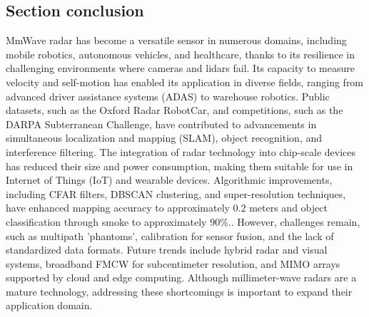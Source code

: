 \subsection{Section conclusion}
MmWave radar has become a versatile sensor in numerous domains, including mobile robotics, autonomous vehicles, and healthcare, thanks to its resilience in challenging environments where cameras and lidars fail. Its capacity to measure velocity and self-motion has enabled its application in diverse fields, ranging from advanced driver assistance systems (ADAS) to warehouse robotics.
Public datasets, such as the Oxford Radar RobotCar, and competitions, such as the DARPA Subterranean Challenge, have contributed to advancements in simultaneous localization and mapping (SLAM), object recognition, and interference filtering. The integration of radar technology into chip-scale devices has reduced their size and power consumption, making them suitable for use in Internet of Things (IoT) and wearable devices. 
Algorithmic improvements, including CFAR filters, DBSCAN clustering, and super-resolution techniques, have enhanced mapping accuracy to approximately 0.2 meters and object classification through smoke to approximately 90\%.. 
However, challenges remain, such as multipath 'phantoms', calibration for sensor fusion, and the lack of standardized data formats. Future trends include hybrid radar and visual systems, broadband FMCW for subcentimeter resolution, and MIMO arrays supported by cloud and edge computing. Although millimeter-wave radars are a mature technology, addressing these shortcomings is important to expand their application domain.